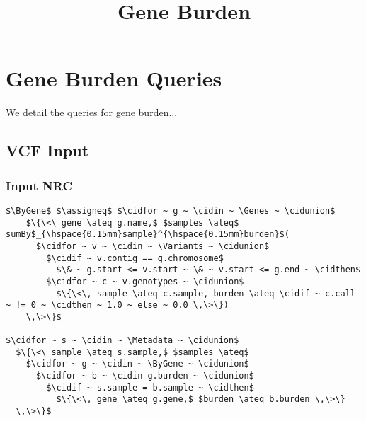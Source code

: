 \documentclass{article}
\begin{document}
\title{Gene Burden}
\date{}

\maketitle

\onecolumn

\section{Gene Burden Queries}

We detail the queries for gene burden...

\subsection{VCF Input}


\subsubsection{Input NRC}


\begin{lstlisting}[language=NRC]
$\ByGene$ $\assigneq$ $\cidfor ~ g ~ \cidin ~ \Genes ~ \cidunion$
    $\{\<\ gene \ateq g.name,$ $samples \ateq$ sumBy$_{\hspace{0.15mm}sample}^{\hspace{0.15mm}burden}$(
      $\cidfor ~ v ~ \cidin ~ \Variants ~ \cidunion$
        $\cidif ~ v.contig == g.chromosome$ 
          $\& ~ g.start <= v.start ~ \& ~ v.start <= g.end ~ \cidthen$
        $\cidfor ~ c ~ v.genotypes ~ \cidunion$
          $\{\<\, sample \ateq c.sample, burden \ateq \cidif ~ c.call ~ != 0 ~ \cidthen ~ 1.0 ~ else ~ 0.0 \,\>\}) 
    \,\>\}$

$\cidfor ~ s ~ \cidin ~ \Metadata ~ \cidunion$
  $\{\<\ sample \ateq s.sample,$ $samples \ateq$
    $\cidfor ~ g ~ \cidin ~ \ByGene ~ \cidunion$
      $\cidfor ~ b ~ \cidin g.burden ~ \cidunion$
        $\cidif ~ s.sample = b.sample ~ \cidthen$
          $\{\<\, gene \ateq g.gene,$ $burden \ateq b.burden \,\>\} 
  \,\>\}$ 

\end{lstlisting}
\end{document}
